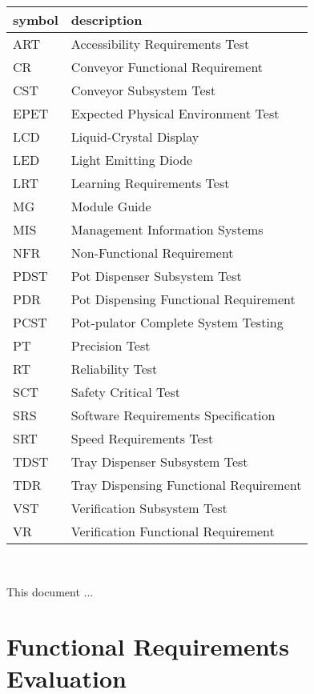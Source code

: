 \documentclass[12pt, titlepage]{article}
\begin{document}
\renewcommand{\arraystretch}{1.2}
\begin{tabular}{l l} 
  \toprule		
  \textbf{symbol} & \textbf{description}\\
  \midrule 
  ART & Accessibility Requirements Test\\
CR & Conveyor Functional Requirement\\
CST & Conveyor Subsystem Test\\
EPET & Expected Physical Environment Test\\
LCD & Liquid-Crystal Display\\
LED & Light Emitting Diode\\
LRT & Learning Requirements Test\\
MG & Module Guide\\
MIS & Management Information Systems\\
NFR & Non-Functional Requirement\\
PDST & Pot Dispenser Subsystem Test\\
PDR & Pot Dispensing Functional Requirement\\
PCST & Pot-pulator Complete System Testing\\
PT & Precision Test\\
RT & Reliability Test\\
SCT & Safety Critical Test\\
SRS & Software Requirements Specification\\
SRT & Speed Requirements Test\\
TDST & Tray Dispenser Subsystem Test\\
TDR & Tray Dispensing Functional Requirement\\
VST & Verification Subsystem Test\\
VR & Verification Functional Requirement\\
  \bottomrule
\end{tabular}\\

\newpage

\tableofcontents

\listoftables %

\listoffigures %

\newpage


This document ...

\section{Functional Requirements Evaluation}
\end{document}
